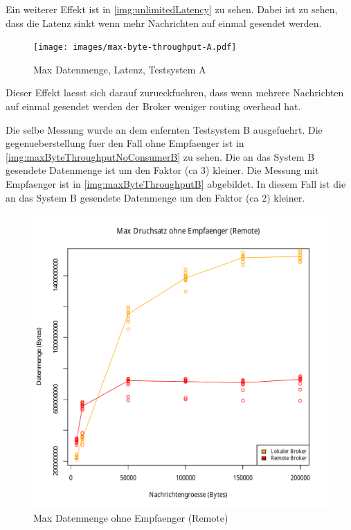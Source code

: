 Ein weiterer Effekt ist in \autoref{img:unlimitedLatency} zu sehen. Dabei ist zu sehen, dass die Latenz sinkt wenn mehr Nachrichten auf einmal gesendet werden.
\begin{figure}
\center
  \texttt{[image: images/max-byte-throughput-A.pdf]}
  \caption{Max Datenmenge, Latenz, Testsystem A}
  \label{img:unlimitedLatency}
\end{figure}
Dieser Effekt laesst sich darauf zurueckfuehren, dass wenn mehrere Nachrichten auf einmal gesendet werden der Broker weniger routing overhead hat.

Die selbe Messung wurde an dem enfernten Testsystem B ausgefuehrt. Die gegenueberstellung fuer den Fall ohne Empfaenger ist in \autoref{img:maxByteThroughputNoConsumerB} zu sehen. Die an das System B gesendete Datenmenge ist um den Faktor (ca 3) kleiner. Die Messung mit Empfaenger ist in \autoref{img:maxByteThroughputB} abgebildet. In diesem Fall ist die an das System B gesendete Datenmenge um den Faktor (ca 2) kleiner.
\begin{figure}
\center
 \includegraphics[width=1\textwidth]{images/measurement/rate-limit-unlimited-no-consumer-AvsB.pdf}
  \caption{Max Datenmenge ohne Empfaenger (Remote)}
  \label{img:maxByteThroughputNoConsumerB}
\end{figure}
